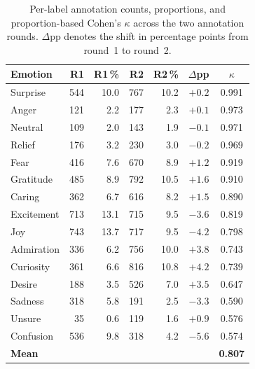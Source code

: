 \begin{table}[ht]
    \centering
    \caption[Per-label inter-annotator agreement]{Per-label annotation counts, proportions, and proportion-based Cohen's $\kappa$
             across the two annotation rounds. $\Delta$pp denotes the shift in percentage
             points from round~1 to round~2.}
    \label{tab:iaa_perlabel}
    \begin{tabular}{lrrrrrc}
        \toprule
        \textbf{Emotion} &
        \textbf{R1} & \textbf{R1\,\%} &
        \textbf{R2} & \textbf{R2\,\%} &
        \textbf{$\Delta$pp} &
        \textbf{$\kappa$} \\
        \midrule
        Surprise    & 544 & 10.0 & 767 & 10.2 & $+0.2$ & 0.991 \\
        Anger       & 121 &  2.2 & 177 &  2.3 & $+0.1$ & 0.973 \\
        Neutral     & 109 &  2.0 & 143 &  1.9 & $-0.1$ & 0.971 \\
        Relief      & 176 &  3.2 & 230 &  3.0 & $-0.2$ & 0.969 \\
        Fear        & 416 &  7.6 & 670 &  8.9 & $+1.2$ & 0.919 \\
        Gratitude   & 485 &  8.9 & 792 & 10.5 & $+1.6$ & 0.910 \\
        Caring      & 362 &  6.7 & 616 &  8.2 & $+1.5$ & 0.890 \\
        Excitement  & 713 & 13.1 & 715 &  9.5 & $-3.6$ & 0.819 \\
        Joy         & 743 & 13.7 & 717 &  9.5 & $-4.2$ & 0.798 \\
        Admiration  & 336 &  6.2 & 756 & 10.0 & $+3.8$ & 0.743 \\
        Curiosity   & 361 &  6.6 & 816 & 10.8 & $+4.2$ & 0.739 \\
        Desire      & 188 &  3.5 & 526 &  7.0 & $+3.5$ & 0.647 \\
        Sadness     & 318 &  5.8 & 191 &  2.5 & $-3.3$ & 0.590 \\
        Unsure      &  35 &  0.6 & 119 &  1.6 & $+0.9$ & 0.576 \\
        Confusion   & 536 &  9.8 & 318 &  4.2 & $-5.6$ & 0.574 \\
        \midrule
        \textbf{Mean} & & & & & & \textbf{0.807} \\
        \bottomrule
    \end{tabular}
\end{table}


